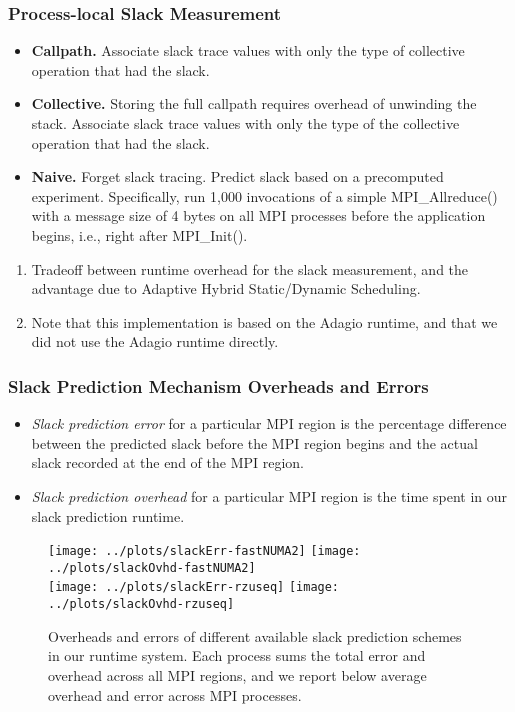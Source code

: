 \begin{frame}
\frametitle{Process-local Slack Measurement}
\begin{itemize} 
\small \item \small \textbf{Callpath.} Associate slack trace values
with only the type of collective operation that had the slack. 
\item \small \textbf{Collective.} Storing the full callpath requires
  overhead of unwinding the stack. Associate slack trace values with
  only the type of the collective operation that had the slack.
\item \small \textbf{Naive.} Forget slack tracing. Predict
  slack based on a precomputed experiment. Specifically, 
  run 1,000 invocations of a simple MPI\_Allreduce() with a
  message size of 4 bytes on all MPI processes before the
  application begins, i.e., right after MPI\_Init(). 
\end{itemize}

\begin{enumerate}
\tiny \item \tiny Tradeoff between runtime overhead for the slack measurement, and the 
advantage due to Adaptive Hybrid Static/Dynamic Scheduling.
\item \tiny Note that this implementation is based on the Adagio
runtime, and that we did not use the Adagio runtime directly. 
\end{enumerate}
\end{frame}

\begin{frame}
\frametitle{Slack Prediction Mechanism Overheads and Errors}
\begin{itemize}
\tiny \item \tiny \textit{Slack prediction error} for a particular MPI
region is the percentage difference 
between the predicted slack before the MPI region begins 
and the actual slack recorded at the end of the MPI region.
\item \tiny \textit{Slack prediction overhead} for a particular MPI
  region is the time spent in our slack prediction runtime.
\end{itemize}
\begin{figure}
\texttt{[image: ../plots/slackErr-fastNUMA2]}
\texttt{[image: ../plots/slackOvhd-fastNUMA2]} \\
\texttt{[image: ../plots/slackErr-rzuseq]}
\texttt{[image: ../plots/slackOvhd-rzuseq]}
\caption{\tiny Overheads and errors of different available slack
  prediction schemes in our runtime system. Each process sums the
  total error and overhead across all MPI regions, and we report below
  average overhead and error across MPI processes.}
\end{figure}
\end{frame}

